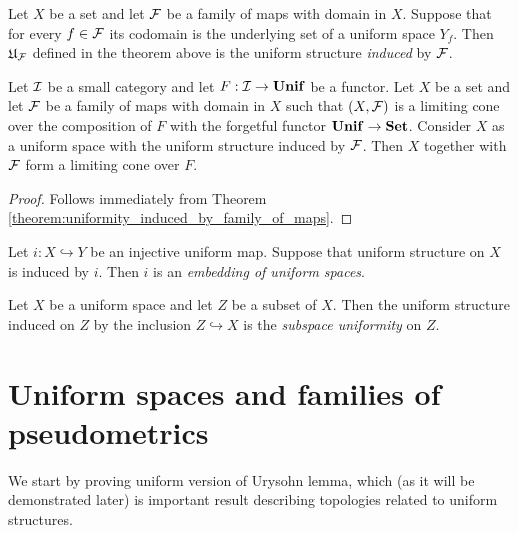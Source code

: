 \begin{definition}
	Let $X$ be a set and let ${\mathcal F}$ be a family of maps with domain in $X$. Suppose that for every $f \in {\mathcal F}$ its codomain is the underlying set of a uniform space $Y_f$. Then ${\mathfrak U}_{{\mathcal F}}$ defined in the theorem above is the uniform structure \textit{induced} by ${\mathcal F}$.
\end{definition}

\begin{corollary}\label{corollary:limits_in_category_of_uniform_spaces}
	Let ${\mathcal I}$ be a small category and let $F:{\mathcal I} \rightarrow \mathbf{Unif}$ be a functor. Let $X$ be a set and let ${\mathcal F}$ be a family of maps with domain in $X$ such that $(X,{\mathcal F})$ is a limiting cone over the composition of $F$ with the forgetful functor $\mathbf{Unif} \rightarrow \mathbf{Set}$. Consider $X$ as a uniform space with the uniform structure induced by ${\mathcal F}$. Then $X$ together with ${\mathcal F}$ form a limiting cone over $F$.
\end{corollary}
\begin{proof}
	Follows immediately from Theorem \ref{theorem:uniformity_induced_by_family_of_maps}.
\end{proof}

\begin{definition}
	Let $i:X \hookrightarrow Y$ be an injective uniform map. Suppose that uniform structure on $X$ is induced by $i$. Then $i$ is an \textit{embedding of uniform spaces}.
\end{definition}

\begin{definition}
	Let $X$ be a uniform space and let $Z$ be a subset of $X$. Then the uniform structure induced on $Z$ by the inclusion $Z\hookrightarrow X$ is the \textit{subspace uniformity} on $Z$.
\end{definition}

\section{Uniform spaces and families of pseudometrics}
\noindent
We start by proving uniform version of Urysohn lemma, which (as it will be demonstrated later) is important result describing topologies related to uniform structures.

